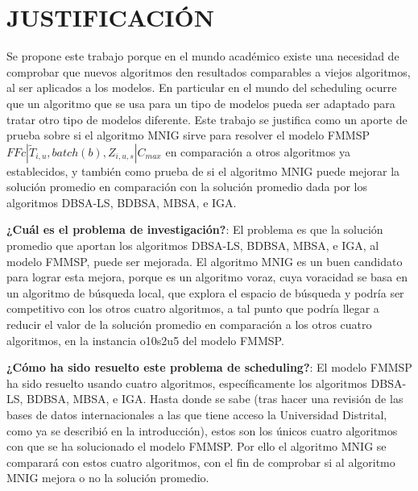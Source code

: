 \documentclass{article}
\def\notac_modelo{$FFc | \tilde{T}_{i, u}, batch(b), Z_{i, u, s} | C_{max}$}
\begin{document}
\section{JUSTIFICACIÓN}

Se propone este trabajo porque en el mundo académico existe una necesidad de comprobar que nuevos algoritmos den resultados comparables a viejos algoritmos, al ser aplicados a los modelos. En particular en el mundo del scheduling ocurre que un algoritmo que se usa para un tipo de modelos pueda ser adaptado para tratar otro tipo de modelos diferente. Este trabajo se justifica como un aporte de prueba sobre si el algoritmo MNIG sirve para resolver el modelo FMMSP \notac_modelo en comparación a otros algoritmos ya establecidos, y también como prueba de si el algoritmo MNIG puede mejorar la solución promedio en comparación con la solución promedio dada por los algoritmos DBSA-LS, BDBSA, MBSA, e IGA.

\vspace{\baselineskip}
\textbf{¿Cuál es el problema de investigación?}: El problema es que la solución promedio que aportan los algoritmos DBSA-LS, BDBSA, MBSA, e IGA, al modelo FMMSP, puede ser mejorada. El algoritmo MNIG es un buen candidato para lograr esta mejora, porque es un algoritmo voraz, cuya voracidad se basa en un algoritmo de búsqueda local, que explora el espacio de búsqueda y podría ser competitivo con los otros cuatro algoritmos, a tal punto que podría llegar a reducir el valor de la solución promedio en comparación a los otros cuatro algoritmos, en la instancia o10s2u5 del modelo FMMSP.

\vspace{\baselineskip}
\textbf{¿Cómo ha sido resuelto este problema de scheduling?}: El modelo FMMSP ha sido resuelto usando cuatro algoritmos, específicamente los algoritmos DBSA-LS, BDBSA, MBSA, e IGA. Hasta donde se sabe (tras hacer una revisión de las bases de datos internacionales a las que tiene acceso la Universidad Distrital, como ya se describió en la introducción), estos son los únicos cuatro algoritmos con que se ha solucionado el modelo FMMSP. Por ello el algoritmo MNIG se comparará con estos cuatro algoritmos, con el fin de comprobar si al algoritmo MNIG mejora o no la solución promedio.
\end{document}
